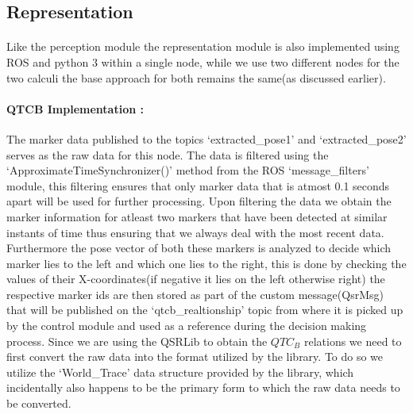 \subsection{Representation}
\paragraph{} Like the perception module the representation module is also implemented using ROS and python 3 within a single node, while we use two different nodes for the two calculi the base approach for both remains the same(as discussed earlier).

\paragraph{QTCB Implementation :} The marker data published to the topics `extracted\_pose1' and `extracted\_pose2' serves as the raw data for this node. The data is filtered using the `ApproximateTimeSynchronizer()' method from the ROS `message\_filters' module, this filtering ensures that only marker data that is atmost 0.1 seconds apart will be used for further processing. Upon filtering the data we obtain the marker information for atleast two markers that have been detected at similar instants of time thus ensuring that we always deal with the most recent data. Furthermore the pose vector of both these markers is analyzed to decide which marker lies to the left and which one lies to the right, this is done by checking the values of their X-coordinates(if negative it lies on the left otherwise right) the respective marker ids are then stored as part of the custom message(QsrMsg) that will be published on the `qtcb\_realtionship' topic from where it is picked up by the control module and used as a reference during the decision making process. Since we are using the QSRLib to obtain the $QTC_B$ relations we need to first convert the raw data into the format utilized by the library. To do so we utilize the `World\_Trace' data structure provided by the library, which incidentally also happens to be the primary form to which the raw data needs to be converted. 


